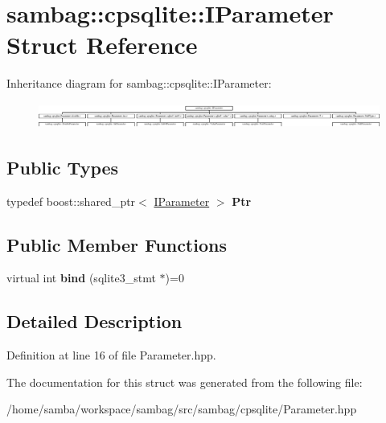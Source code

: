 \hypertarget{structsambag_1_1cpsqlite_1_1_i_parameter}{
\section{sambag::cpsqlite::IParameter Struct Reference}
\label{structsambag_1_1cpsqlite_1_1_i_parameter}
}
Inheritance diagram for sambag::cpsqlite::IParameter:\begin{figure}[H]
\begin{center}
\leavevmode
\includegraphics[height=0.845070cm]{structsambag_1_1cpsqlite_1_1_i_parameter}
\end{center}
\end{figure}
\subsection*{Public Types}
\begin{DoxyCompactItemize}
\item 
\hypertarget{structsambag_1_1cpsqlite_1_1_i_parameter_a7963bf41b6c1cfae43004cd5dfc17f08}{
typedef boost::shared\_\-ptr$<$ \hyperlink{structsambag_1_1cpsqlite_1_1_i_parameter}{IParameter} $>$ {\bfseries Ptr}}
\label{structsambag_1_1cpsqlite_1_1_i_parameter_a7963bf41b6c1cfae43004cd5dfc17f08}

\end{DoxyCompactItemize}
\subsection*{Public Member Functions}
\begin{DoxyCompactItemize}
\item 
\hypertarget{structsambag_1_1cpsqlite_1_1_i_parameter_abf833ee2693417d9837cd1d64bc6e459}{
virtual int {\bfseries bind} (sqlite3\_\-stmt $\ast$)=0}
\label{structsambag_1_1cpsqlite_1_1_i_parameter_abf833ee2693417d9837cd1d64bc6e459}

\end{DoxyCompactItemize}


\subsection{Detailed Description}


Definition at line 16 of file Parameter.hpp.



The documentation for this struct was generated from the following file:\begin{DoxyCompactItemize}
\item 
/home/samba/workspace/sambag/src/sambag/cpsqlite/Parameter.hpp\end{DoxyCompactItemize}
